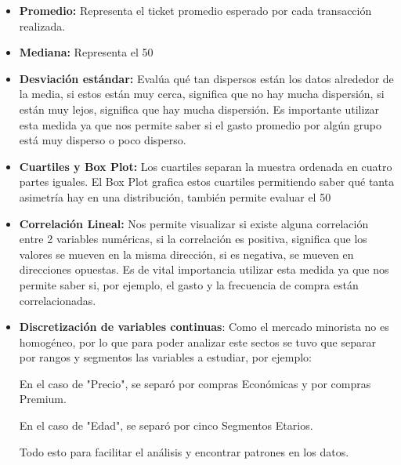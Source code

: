 \documentclass[oneside,11pt]{Latex/Classes/PhDthesisPSnPDF}
\begin{document}
\begin{itemize}
    \item \textbf{Promedio:} Representa el ticket promedio esperado por cada transacción realizada.

\item \textbf{Mediana:} Representa el 50%

\item \textbf{Desviación estándar:} Evalúa qué tan dispersos están los datos alrededor de la media, si estos están muy cerca, significa que no hay mucha dispersión, si están muy lejos, significa que hay mucha dispersión. Es importante utilizar esta medida ya que nos permite saber si el gasto promedio por algún grupo está muy disperso o poco disperso.

\item \textbf{Cuartiles y Box Plot:} Los cuartiles separan la muestra ordenada en cuatro partes iguales. El Box Plot grafica estos cuartiles permitiendo saber qué tanta asimetría hay en una distribución, también permite evaluar el 50%

\item \textbf{Correlación Lineal:} Nos permite visualizar si existe alguna correlación entre 2 variables numéricas, si la correlación es positiva, significa que los valores se mueven en la misma dirección, si es negativa, se mueven en direcciones opuestas. Es de vital importancia utilizar esta medida ya que nos permite saber si, por ejemplo, el gasto y la frecuencia de compra están correlacionadas.

\item \textbf{Discretización de variables continuas}: Como el mercado minorista no es homogéneo, por lo que para poder analizar este sectos se tuvo que separar por rangos y segmentos las variables a estudiar, por ejemplo:

En el caso de "Precio", se separó por compras Económicas y por compras Premium.

En el caso de "Edad", se separó por cinco Segmentos Etarios.

Todo esto para facilitar el análisis y encontrar patrones en los datos.

\end{itemize}
\end{document}
